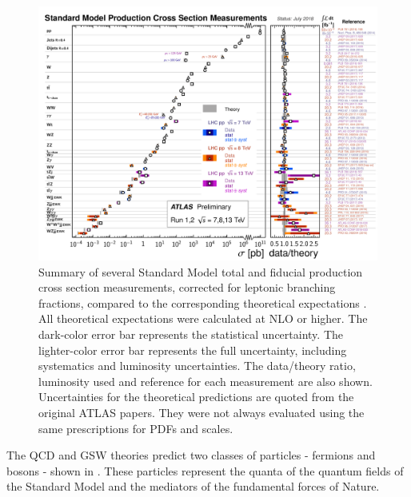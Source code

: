 \begin{figure}[!htbp]
  \begin{center}
    \includegraphics[width=\linewidth]{figures/theory/xsection_measurements.pdf}
\caption{ Summary of several Standard Model total and fiducial production cross
section measurements, corrected for leptonic branching fractions, compared to
the corresponding theoretical expectations \cite{StandardModelPublicResults}.
All theoretical expectations were calculated at NLO or higher. The dark-color
error bar represents the statistical uncertainty. The lighter-color error bar
represents the full uncertainty, including systematics and luminosity
uncertainties. The data/theory ratio, luminosity used and reference for each
measurement are also shown. Uncertainties for the theoretical predictions are
quoted from the original ATLAS papers. They were not always evaluated using the
same prescriptions for PDFs and scales.}
    \label{fig:xsection_measurements}
  \end{center}
\end{figure}

The QCD and GSW theories predict two classes of particles - fermions and bosons -
shown in . These particles represent the quanta
of the quantum fields of the Standard Model and the mediators of the fundamental
forces of Nature.


